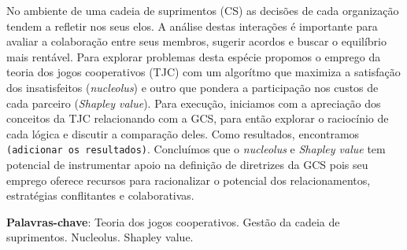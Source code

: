 \documentclass[
	article,			        %
	11pt,				          %
	oneside,			        %
	a4paper,			        %
	english,			        %
	brazil,				        %
	sumario=tradicional
]{abntex2}\usepackage[]{graphicx}\usepackage[]{color}
\author{João B. G. Brito, \emph{Esp.}   \\   
    \href{mailto:jbgb@uol.com.br}{jbgb@uol.com.br} 
  \and {Michel J. Anzanello, \emph{Phd}} \\
    \href{mailto:michel.anzanello@gmail.com}{michel.anzanello@gmail.com}
}
\date{\today}
\begin{document}

\frenchspacing 



%
%
\maketitle

\begin{resumoumacoluna}
No ambiente de uma cadeia de suprimentos (CS) as decisões de cada organização tendem a refletir nos seus elos. A análise destas interações é importante para avaliar a colaboração entre seus membros, sugerir acordos e buscar o equilíbrio mais rentável. Para explorar problemas desta espécie propomos o emprego da teoria dos jogos cooperativos (TJC) com um algorítmo que maximiza a satisfação dos insatisfeitos (\emph{nucleolus}) e outro que pondera a participação nos custos de cada parceiro (\emph{Shapley value}). Para execução, iniciamos com a apreciação dos conceitos da TJC relacionando com a GCS, para então explorar o raciocínio de cada lógica e discutir a comparação deles. Como resultados, encontramos \texttt{(adicionar os resultados)}. Concluímos que o \emph{nucleolus} e \emph{Shapley value} tem potencial de instrumentar apoio na definição de diretrizes da GCS pois seu emprego oferece recursos para racionalizar o potencial dos relacionamentos, estratégias conflitantes e colaborativas.

 \vspace{\onelineskip}
 
 \noindent
 \textbf{Palavras-chave}: Teoria dos jogos cooperativos. Gestão da cadeia de suprimentos. Nucleolus. Shapley value.
\end{resumoumacoluna}


\textual
\end{document}
